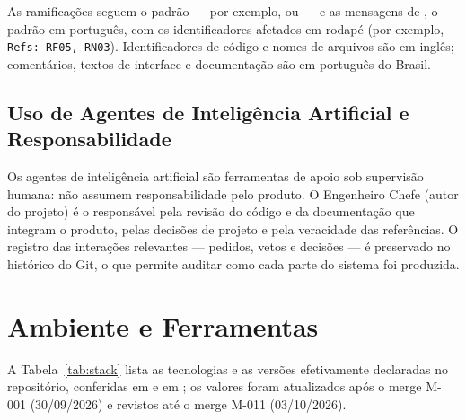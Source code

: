As ramificações seguem o padrão  --- por exemplo,  ou  --- e as mensagens de , o padrão  \cite{conventionalcommits} em português, com os identificadores afetados em rodapé (por exemplo, \texttt{Refs: RF05, RN03}). Identificadores de código e nomes de arquivos são em inglês; comentários, textos de interface e documentação são em português do Brasil.

\subsection{Uso de Agentes de Inteligência Artificial e Responsabilidade}\label{sec:ia-autoria}

Os agentes de inteligência artificial são ferramentas de apoio sob supervisão humana: não assumem responsabilidade pelo produto. O Engenheiro Chefe (autor do projeto) é o responsável pela revisão do código e da documentação que integram o produto, pelas decisões de projeto e pela veracidade das referências. O registro das interações relevantes --- pedidos, vetos e decisões --- é preservado no histórico do Git, o que permite auditar como cada parte do sistema foi produzida.

\section{Ambiente e Ferramentas}\label{sec:ambiente}

A Tabela~\ref{tab:stack} lista as tecnologias e as versões efetivamente declaradas no repositório, conferidas em  e em ; os valores foram atualizados após o merge M-001 (30/09/2026) e revistos até o merge M-011 (03/10/2026).

